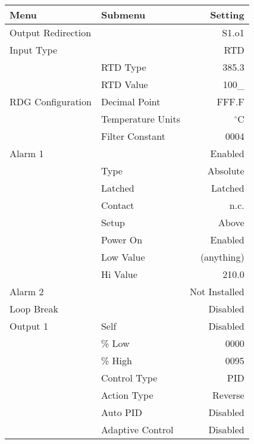 \begin{table}
\begin{center}
\begin{tabular}{|l|l|r|}
\hline\hline
Menu & Submenu & Setting \\
\hline
Output Redirection  &                        & S1.o1 \\
\hline
Input Type          &                        & RTD   \\
                    & RTD Type               & 385.3 \\
                    & RTD Value              & 100\_  \\
\hline
RDG Configuration   & Decimal Point          & FFF.F \\
                    & Temperature Units      & $^\circ$C \\
                    & Filter Constant        & 0004 \\
\hline
Alarm 1             &                        & Enabled \\
                    & Type                   & Absolute \\
                    & Latched                & Latched \\
                    & Contact                & n.c. \\
                    & Setup                  & Above \\
                    & Power On               & Enabled \\
                    & Low Value              & (anything) \\
                    & Hi Value               & 210.0 \\
\hline
Alarm 2             &                        & Not Installed \\
\hline
Loop Break          &                        & Disabled \\  
\hline
Output 1            & Self                   & Disabled \\
                    & \% Low                 & 0000 \\
                    & \% High                & 0095 \\
                    & Control Type           & PID \\
                    & Action Type            & Reverse \\
                    & Auto PID               & Disabled \\
                    & Adaptive Control       & Disabled \\

\end{tabular}
\end{center}
\end{table}
